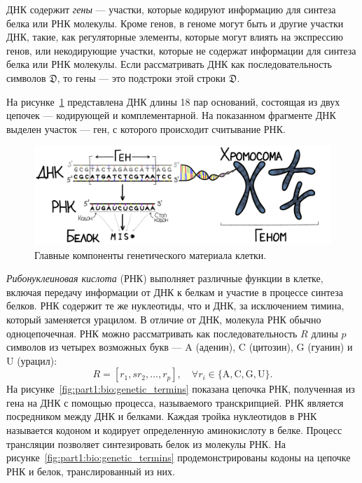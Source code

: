 ДНК содержит \emph{гены} --- участки, которые кодируют информацию для синтеза белка или РНК молекулы.
Кроме генов, в геноме могут быть и другие участки ДНК, такие, как регуляторные элементы, которые могут влиять на экспрессию генов, или некодирующие участки, которые не содержат информации для синтеза белка или РНК молекулы.
Если рассматривать ДНК как последовательность символов $\mathfrak{D}$, то гены --- это подстроки этой строки $\mathfrak{D}$.

На рисунке~\ref{fig:part1:bio:genetic_components} представлена ДНК длины 18 пар оснований, состоящая из двух цепочек --- кодирующей и комплементарной.
На показанном фрагменте ДНК выделен участок --- ген, с которого происходит считывание РНК.

\begin{figure}
    \centering
    \includegraphics[width=\textwidth]{images/part1/biology/genetic_information.pdf}
    \caption{Главные компоненты генетического материала клетки.}
    \label{fig:part1:bio:genetic_components}
\end{figure}

\emph{Рибонуклеиновая кислота} (РНК) выполняет различные функции в клетке, включая передачу информации от ДНК к белкам и участие в процессе синтеза белков.
РНК содержит те же нуклеотиды, что и ДНК, за исключением тимина, который заменяется урацилом.
В отличие от ДНК, молекула РНК обычно одноцепочечная.
РНК можно рассматривать как последовательность $R$ длины $p$ символов из четырех возможных букв --- A (аденин), C (цитозин), G (гуанин) и U (урацил):
$$R = [r_1, sr_2, \ldots, r_p],\quad \forall r_i\in \{\text{A}, \text{C}, \text{G}, \text{U}\}.$$
На рисунке~\ref{fig:part1:bio:genetic_termins} показана цепочка РНК, полученная из гена на ДНК с помощью процесса, называемого транскрипцией.
РНК является посредником между ДНК и белками.
Каждая тройка нуклеотидов в РНК называется кодоном и кодирует определенную аминокислоту в белке.
Процесс трансляции позволяет синтезировать белок из молекулы РНК.
На рисунке~\ref{fig:part1:bio:genetic_termins} продемонстрированы кодоны на цепочке РНК и белок, транслированный из них.

